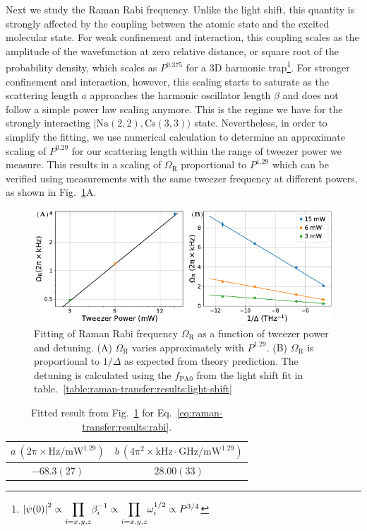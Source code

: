 Next we study the Raman Rabi frequency.
Unlike the light shift, this quantity is strongly affected by the coupling
between the atomic state and the excited molecular state.
For weak confinement and interaction,
this coupling scales as the amplitude of the wavefunction at zero relative distance,
or square root of the probability density,
which scales as $P^{0.375}$ for a 3D harmonic trap\footnote{
  ${\left|{\psi(0)}\right|}^2\propto{\displaystyle\prod_{i=x,y,z}}\beta_i^{-1}\propto{\displaystyle\prod_{i=x,y,z}}\omega_i^{1/2}\propto P^{3/4}$}.
For stronger confinement and interaction, however,
this scaling starts to saturate as the scattering length $a$ approaches
the harmonic oscillator length $\beta$ and does not follow a simple power law scaling anymore.
This is the regime we have for the strongly interacting $|\mathrm{Na(2,2),Cs(3,3)}\rangle$ state.
Nevertheless, in order to simplify the fitting,
we use numerical calculation to determine an approximate scaling of $P^{0.29}$
for our scattering length within the range of tweezer power we measure.
This results in a scaling of $\Omega_{\mathrm{R}}$ proportional to $P^{1.29}$
which can be verified using measurements with the same tweezer frequency at different powers,
as shown in Fig.~\ref{fig:raman-transfer:results:rabi}A.
\begin{figure}
  \centering
  \includegraphics[width=\textwidth]{figures/raman_transfer_scaling_rabi.pdf}
  \caption[Fitting of Raman Rabi frequencies.]{
    Fitting of Raman Rabi frequency $\Omega_{\mathrm{R}}$
    as a function of tweezer power and detuning.
    (A) $\Omega_{\mathrm{R}}$ varies approximately with $P^{1.29}$.
    (B) $\Omega_{\mathrm{R}}$ is proportional to $1/\Delta$ as expected from theory prediction.
    The detuning is calculated using the $f_{\mathrm{PA0}}$ from the light shift fit
    in table.~\ref{table:raman-transfer:results:light-shift}
    \label{fig:raman-transfer:results:rabi}}
\end{figure}
\begin{table}
  \centering
  \caption[Fitting result of Raman Rabi frequencies.]{
    Fitted result from Fig.~\ref{fig:raman-transfer:results:rabi}
    for Eq.~\ref{eq:raman-transfer:results:rabi}.
    \label{table:raman-transfer:results:rabi}}
  \begin{tabular}{|c|c|}
    \hline
    $a~(\mathrm{2\pi\times Hz/mW^{1.29}})$&$b~(\mathrm{4\pi^2\times kHz\cdot\!GHz/mW^{1.29}})$\\\hline
    $-68.3(27)$&$28.00(33)$\\\hline
  \end{tabular}
\end{table}
